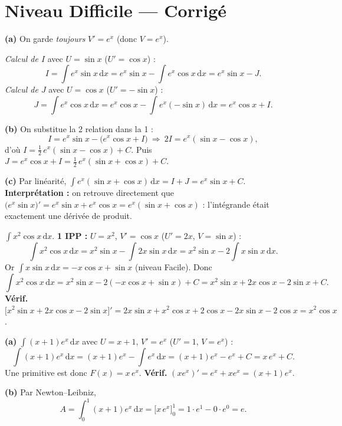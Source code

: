 \documentclass[11pt,a4paper]{article}
\newcommand{\dd}{\mathrm{d}}
\begin{document}
\section*{Niveau Difficile — Corrigé}

\begin{corr}
\textbf{(a)} On garde \emph{toujours} $V'=e^x$ (donc $V=e^x$).

\emph{Calcul de $I$} avec $U=\sin x$ ($U'=\cos x$) :
\[
I=\int e^{x}\sin x\,\dd x=e^{x}\sin x-\int e^{x}\cos x\,\dd x=e^{x}\sin x-J.
\]
\emph{Calcul de $J$} avec $U=\cos x$ ($U'=-\sin x$) :
\[
J=\int e^{x}\cos x\,\dd x=e^{x}\cos x-\int e^{x}(-\sin x)\,\dd x=e^{x}\cos x+I.
\]

\textbf{(b)} On substitue la 2\ieme{} relation dans la 1\iere{} :
\[
I=e^{x}\sin x-\bigl(e^{x}\cos x+I\bigr)\ \Longrightarrow\ 2I=e^{x}(\sin x-\cos x),
\]
d'où $\displaystyle \boxed{I=\tfrac12\,e^{x}(\sin x-\cos x)+C.}$ Puis
$J=e^{x}\cos x+I=\boxed{\tfrac12\,e^{x}(\sin x+\cos x)+C.}$

\textbf{(c)} Par linéarité, $\displaystyle\int e^{x}(\sin x+\cos x)\,\dd x=I+J=e^{x}\sin x+C.$
\textbf{Interprétation :} on retrouve directement que $\bigl(e^{x}\sin x\bigr)'=e^{x}\sin x+e^{x}\cos x
=e^{x}(\sin x+\cos x)$ : l'intégrande était exactement une dérivée de produit.
\end{corr}

\begin{corr}
$\displaystyle\int x^{2}\cos x\,\dd x$. \textbf{1\iere{} IPP :} $U=x^{2}$, $V'=\cos x$ ($U'=2x$, $V=\sin x$) :
\[
\int x^{2}\cos x\,\dd x=x^{2}\sin x-\int 2x\sin x\,\dd x=x^{2}\sin x-2\int x\sin x\,\dd x.
\]
Or $\displaystyle\int x\sin x\,\dd x=-x\cos x+\sin x$ (niveau Facile). Donc
\[
\int x^{2}\cos x\,\dd x=x^{2}\sin x-2(-x\cos x+\sin x)+C=\boxed{x^{2}\sin x+2x\cos x-2\sin x+C.}
\]
\textbf{Vérif.} $\bigl[x^{2}\sin x+2x\cos x-2\sin x\bigr]'
=2x\sin x+x^{2}\cos x+2\cos x-2x\sin x-2\cos x=x^{2}\cos x$. \checkmark
\end{corr}

\begin{corr}
\textbf{(a)} $\displaystyle\int (x+1)e^{x}\,\dd x$ avec $U=x+1$, $V'=e^{x}$ ($U'=1$, $V=e^{x}$) :
\[
\int (x+1)e^{x}\,\dd x=(x+1)e^{x}-\int e^{x}\,\dd x=(x+1)e^{x}-e^{x}+C=x\,e^{x}+C.
\]
Une primitive est donc $F(x)=x\,e^{x}$. \textbf{Vérif.} $(x e^{x})'=e^{x}+x e^{x}=(x+1)e^{x}$. \checkmark

\textbf{(b)} Par Newton--Leibniz,
\[
A=\int_{0}^{1}(x+1)e^{x}\,\dd x=\bigl[x\,e^{x}\bigr]_{0}^{1}=1\cdot e^{1}-0\cdot e^{0}=\boxed{e.}
\]
\end{corr}
\end{document}
